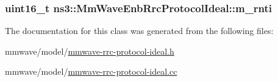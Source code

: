 \subsubsection[{\texorpdfstring{m\+\_\+rnti}{m_rnti}}]{\setlength{\rightskip}{0pt plus 5cm}uint16\+\_\+t ns3\+::\+Mm\+Wave\+Enb\+Rrc\+Protocol\+Ideal\+::m\+\_\+rnti\hspace{0.3cm}{\ttfamily [private]}}\hypertarget{classns3_1_1MmWaveEnbRrcProtocolIdeal_a66b3bbef5f4a20b576e563076d2ac99e}{}\label{classns3_1_1MmWaveEnbRrcProtocolIdeal_a66b3bbef5f4a20b576e563076d2ac99e}


The documentation for this class was generated from the following files\+:\begin{DoxyCompactItemize}
\item 
mmwave/model/\hyperlink{mmwave-rrc-protocol-ideal_8h}{mmwave-\/rrc-\/protocol-\/ideal.\+h}\item 
mmwave/model/\hyperlink{mmwave-rrc-protocol-ideal_8cc}{mmwave-\/rrc-\/protocol-\/ideal.\+cc}\end{DoxyCompactItemize}
